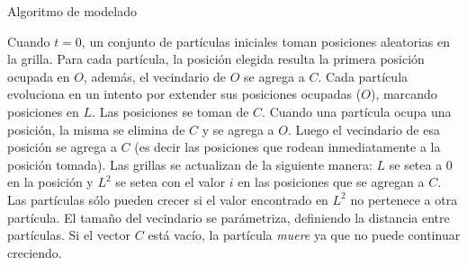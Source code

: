 \begin{algorithm}[h!]
\caption{Algoritmo de modelado}
\begin{algorithmic}


    \EndFor
\EndFor

        \EndIf
                 
                 
            \EndIf
        \EndFor
    \EndFor
\EndFor
\end{algorithmic}
\end{algorithm}

Cuando $t = 0$, un conjunto de part\'iculas iniciales toman posiciones aleatorias en la grilla.
Para cada partícula, la posici\'on elegida resulta la primera posici\'on ocupada en $O$, adem\'as, el vecindario de $O$ se agrega a $C$.
Cada part\'icula evoluciona en un intento por extender sus posiciones ocupadas ($O$), marcando posiciones en $L$. Las posiciones se toman de $C$.
Cuando una part\'icula ocupa una posici\'on, la misma se elimina de $C$ y se agrega a $O$.
Luego el vecindario de esa posici\'on se agrega a $C$ (es decir las posiciones que rodean inmediatamente a la posici\'on tomada).
Las grillas se actualizan de la siguiente manera: $L$ se setea a $0$ en la posici\'on y $L^{2}$ se setea con el valor $i$ en las posiciones que se agregan a $C$. Las part\'iculas s\'olo pueden crecer si el valor encontrado en $L^{2}$ no pertenece a otra part\'icula.
El tama\~no del vecindario se par\'ametriza, definiendo la distancia entre part\'iculas.
Si el vector $C$ est\'a vac\'io, la part\'icula {\em muere} ya que no puede continuar creciendo.


